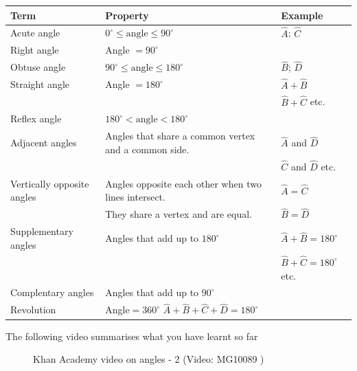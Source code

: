 \begin{table}[H]
\begin{center}
\begin{tabular}{|l|l|l|} \hline
Term & Property & Example\\ \hline
Acute angle & $0^{\circ} \leq \mbox{angle} \leq 90^{\circ}$ & $\hat{A}$; $\hat{C}$ \\ \hline
Right angle & Angle $= 90^{\circ}$ &  \\ \hline
Obtuse angle & $90^{\circ} \leq \mbox{angle} \leq 180^{\circ}$ & $\hat{B}$; $\hat{D}$ \\ \hline
Straight angle & Angle $= 180^{\circ}$ & $\hat{A} + \hat{B}$\\
& & $\hat{B} + \hat{C}$ etc.  \\ \hline
Reflex angle & $180^{\circ} < \mbox{angle} < 180^{\circ}$ &  \\ \hline
Adjacent angles & Angles that share a common vertex and a common side. & $\hat{A}$ and $\hat{D}$ \\ 
& & $\hat{C}$ and $\hat{D}$ etc. \\ \hline
Vertically opposite angles & Angles opposite each other when two lines intersect.& $\hat{A}=\hat{C}$\\
 & They share a vertex and are equal. & $\hat{B}=\hat{D}$\\ \hline
Supplementary angles & Angles that add up to $180^{\circ}$ & $\hat{A}+\hat{B}=180^{\circ}$\\
& & $\hat{B}+\hat{C}=180^{\circ}$ etc. \\ \hline
Complentary angles & Angles that add up to $90^{\circ}$ & \\ \hline
Revolution & Angle$=360^{\circ}$ $\hat{A}+\hat{B}+\hat{C}+\hat{D}=180^{\circ}$& \\

\end{tabular}
\end{center}
\end{table}
\par
\par
\par

The following video summarises what you have learnt so far
\setcounter{subfigure}{0}
\begin{figure}[H] %
\textnormal{Khan Academy video on angles - 2}\vspace{.1in} \nopagebreak
\label{m39370*yt-media2}\label{m39370*yt-video2}
{ (Video:  MG10089 )}
\vspace{2pt}
\vspace{.1in}
\end{figure}       \par 

